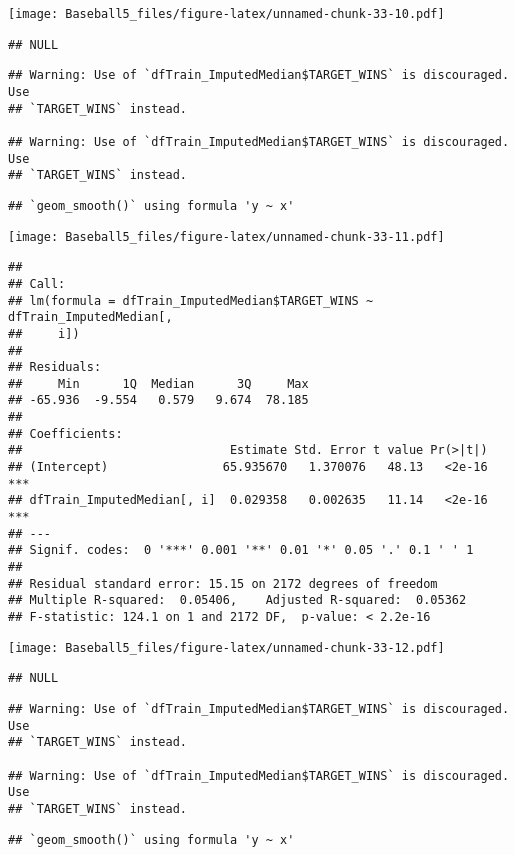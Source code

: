 \documentclass[
]{article}
\begin{document}
\texttt{[image: Baseball5\_files/figure-latex/unnamed-chunk-33-10.pdf]}

\begin{verbatim}
## NULL
\end{verbatim}

\begin{verbatim}
## Warning: Use of `dfTrain_ImputedMedian$TARGET_WINS` is discouraged. Use
## `TARGET_WINS` instead.

## Warning: Use of `dfTrain_ImputedMedian$TARGET_WINS` is discouraged. Use
## `TARGET_WINS` instead.
\end{verbatim}

\begin{verbatim}
## `geom_smooth()` using formula 'y ~ x'
\end{verbatim}

\texttt{[image: Baseball5\_files/figure-latex/unnamed-chunk-33-11.pdf]}

\begin{verbatim}
## 
## Call:
## lm(formula = dfTrain_ImputedMedian$TARGET_WINS ~ dfTrain_ImputedMedian[, 
##     i])
## 
## Residuals:
##     Min      1Q  Median      3Q     Max 
## -65.936  -9.554   0.579   9.674  78.185 
## 
## Coefficients:
##                             Estimate Std. Error t value Pr(>|t|)    
## (Intercept)                65.935670   1.370076   48.13   <2e-16 ***
## dfTrain_ImputedMedian[, i]  0.029358   0.002635   11.14   <2e-16 ***
## ---
## Signif. codes:  0 '***' 0.001 '**' 0.01 '*' 0.05 '.' 0.1 ' ' 1
## 
## Residual standard error: 15.15 on 2172 degrees of freedom
## Multiple R-squared:  0.05406,    Adjusted R-squared:  0.05362 
## F-statistic: 124.1 on 1 and 2172 DF,  p-value: < 2.2e-16
\end{verbatim}

\texttt{[image: Baseball5\_files/figure-latex/unnamed-chunk-33-12.pdf]}

\begin{verbatim}
## NULL
\end{verbatim}

\begin{verbatim}
## Warning: Use of `dfTrain_ImputedMedian$TARGET_WINS` is discouraged. Use
## `TARGET_WINS` instead.

## Warning: Use of `dfTrain_ImputedMedian$TARGET_WINS` is discouraged. Use
## `TARGET_WINS` instead.
\end{verbatim}

\begin{verbatim}
## `geom_smooth()` using formula 'y ~ x'
\end{verbatim}
\end{document}
